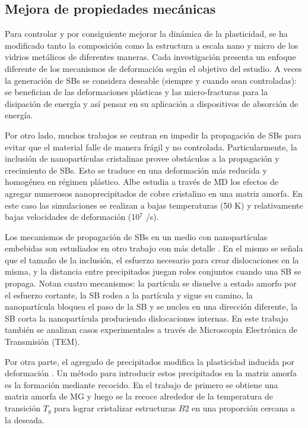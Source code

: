 \subsection{Mejora de propiedades mecánicas}
\label{S1_2_3}

Para controlar y por consiguiente mejorar la dinámica de la plasticidad, se ha modificado tanto la composición como la estructura a escala nano y micro de los vidrios metálicos de diferentes maneras. Cada investigación presenta un enfoque diferente de los mecanismos de deformación según el objetivo del estudio. A veces la generación de SBs se considera deseable (siempre y cuando sean controladas): \cite{chen14} se benefician de las deformaciones plásticas y las micro-fracturas para la disipación de energía y así pensar en su aplicación a dispositivos de absorción de energía.

Por otro lado, muchos trabajos se centran en impedir la propagación de SBs para evitar que el material falle de manera frágil y no controlada. Particularmente, la inclusión de nanopartículas cristalinas provee obstáculos a la propagación y crecimiento de SBs. Esto se traduce en una deformación más reducida y homogénea en régimen plástico. Albe \citep{albe13} estudia a través de MD los efectos de agregar numerosos nanoprecipitados de cobre cristalino en una matriz amorfa. En este caso las simulaciones se realizan a bajas temperaturas (50 K) y relativamente bajas velocidades de deformación (10$^{7}$ /s).

Los mecanismos de propagación de SBs en un medio con nanopartículas embebidas son estudiados en otro trabajo con más detalle \citep{brink15}. En el mismo se señala que el tamaño de la inclusión, el esfuerzo necesario para crear dislocaciones en la misma, y la distancia entre precipitados juegan roles conjuntos cuando una SB se propaga. Notan cuatro mecanismos: la partícula se disuelve a estado amorfo por el esfuerzo cortante, la SB rodea a la partícula y sigue su camino, la nanopartícula bloquea el paso de la SB y se nuclea en una dirección diferente, la SB corta la nanopartícula produciendo dislocaciones internas. En este trabajo también se analizan casos experimentales a través de Microscopia Electrónica de Transmisión (TEM).

Por otra parte, el agregado de precipitados modifica la plasticidad inducida por deformación \citep{kuo14}. Un método para introducir estos precipitados en la matriz amorfa es la formación mediante recocido. En el trabajo de \cite{wei14} primero se obtiene una matriz amorfa de MG y luego se la recoce alrededor de la temperatura de transición $T_{g}$ para lograr cristalizar estructuras $B2$ en una proporción cercana a la deseada.

